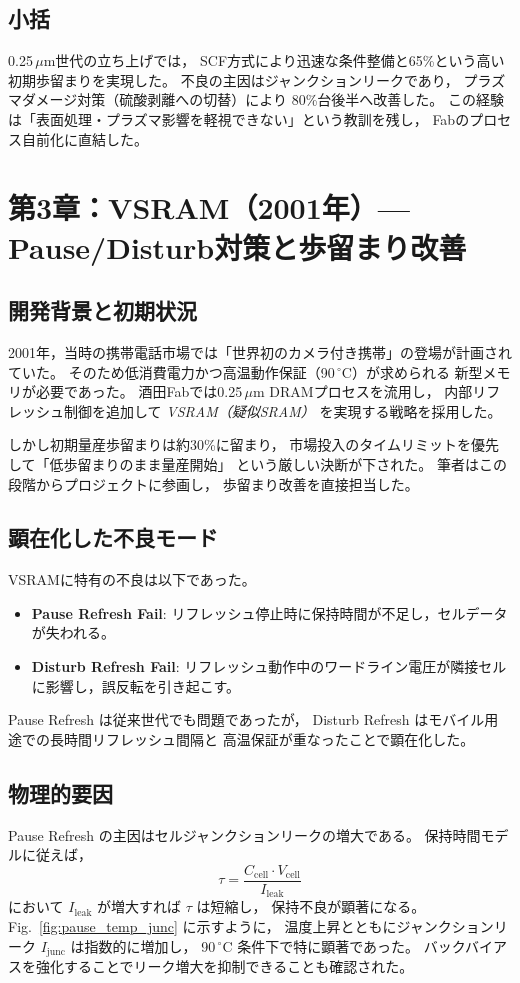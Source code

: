 \documentclass[conference]{IEEEtran}
\begin{document}
\subsection{小括}
0.25\,$\mu$m世代の立ち上げでは，
SCF方式により迅速な条件整備と65\%という高い初期歩留まりを実現した。
不良の主因はジャンクションリークであり，
プラズマダメージ対策（硫酸剥離への切替）により
80\%台後半へ改善した。
この経験は「表面処理・プラズマ影響を軽視できない」という教訓を残し，
Fabのプロセス自前化に直結した。

\section{第3章：VSRAM（2001年）— Pause/Disturb対策と歩留まり改善}

\subsection{開発背景と初期状況}
2001年，当時の携帯電話市場では「世界初のカメラ付き携帯」の登場が計画されていた。
そのため低消費電力かつ高温動作保証（90\,$^\circ$C）が求められる
新型メモリが必要であった。
酒田Fabでは0.25\,$\mu$m DRAMプロセスを流用し，
内部リフレッシュ制御を追加して \emph{VSRAM（疑似SRAM）} を実現する戦略を採用した。

しかし初期量産歩留まりは約30\%に留まり，
市場投入のタイムリミットを優先して「低歩留まりのまま量産開始」
という厳しい決断が下された。
筆者はこの段階からプロジェクトに参画し，
歩留まり改善を直接担当した。

\subsection{顕在化した不良モード}
VSRAMに特有の不良は以下であった。
\begin{itemize}
  \item \textbf{Pause Refresh Fail}: リフレッシュ停止時に保持時間が不足し，セルデータが失われる。
  \item \textbf{Disturb Refresh Fail}: リフレッシュ動作中のワードライン電圧が隣接セルに影響し，誤反転を引き起こす。
\end{itemize}

Pause Refresh は従来世代でも問題であったが，
Disturb Refresh はモバイル用途での長時間リフレッシュ間隔と
高温保証が重なったことで顕在化した。

\subsection{物理的要因}
Pause Refresh の主因はセルジャンクションリークの増大である。
保持時間モデルに従えば，
\[
\tau = \frac{C_{\mathrm{cell}} \cdot V_{\mathrm{cell}}}{I_{\mathrm{leak}}}
\]
において $I_{\mathrm{leak}}$ が増大すれば $\tau$ は短縮し，
保持不良が顕著になる。
Fig.~\ref{fig:pause_temp_junc} に示すように，
温度上昇とともにジャンクションリーク $I_{\mathrm{junc}}$ は指数的に増加し，
90\,$^\circ$C 条件下で特に顕著であった。
バックバイアスを強化することでリーク増大を抑制できることも確認された。
\end{document}
